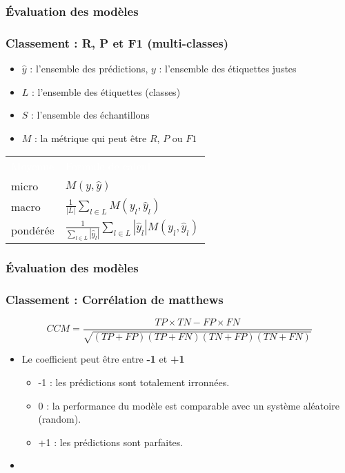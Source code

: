 \documentclass[xcolor=table]{beamer}
\begin{document}
\begin{frame}
	\frametitle{Évaluation des modèles}
	\frametitle{Classement : R, P et F1 (multi-classes)}
	
	\begin{itemize}
		\item $\hat{y}$ : l'ensemble des prédictions, $y$ : l'ensemble des étiquettes justes
		\item $L$ : l'ensemble des étiquettes (classes)
		\item $S$ : l'ensemble des échantillons
		\item $M$ : la métrique qui peut être $R$, $P$ ou $F1$
	\end{itemize}


\begin{center}
	\begin{tabular}{p{}p{}}
		\rowcolor{darkblue}
		\textcolor{white}{Moyenne} & \textcolor{white}{Formule de calcul} \\
		micro & $M(y, \hat{y})$ \\
		macro & $\frac{1}{|L|} \sum_{l \in L} M(y_l, \hat{y}_l)$ \\
		pondérée & $\frac{1}{\sum_{l \in L} |\hat{y}_l|} \sum_{l \in L} |\hat{y}_l| M(y_l, \hat{y}_l)$ \\
	\end{tabular}
\end{center}
	
	
\end{frame}

\begin{frame}
	\frametitle{Évaluation des modèles}
	\frametitle{Classement : Corrélation de matthews}
	
	\[CCM = \frac{TP \times TN - FP \times FN}{\sqrt{(TP + FP)(TP + FN)(TN + FP)(TN + FN)}}\]
	\begin{itemize}
		\item Le coefficient peut être entre \textbf{-1} et \textbf{+1}
		\begin{itemize}
			\item -1 : les prédictions sont totalement irronnées.
			\item 0 : la performance du modèle est comparable avec un système aléatoire (random).
			\item +1 : les prédictions sont parfaites.
		\end{itemize}
		\item {}
	\end{itemize}
	
	
\end{frame}
\end{document}
